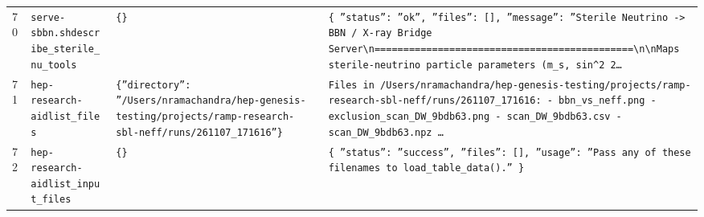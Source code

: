 \documentclass[11pt,a4paper]{article}
\begin{document}
\begin{longtable}{@{}p{}p{}p{}p{}@{}}
70 & \texttt{serve-sbbn.sh}\newline\texttt{describe\_\allowbreak{}sterile\_\allowbreak{}nu\_\allowbreak{}tools} & \texttt{\{\}\allowbreak{}} & \texttt{\{   ''status'':\allowbreak{} ''ok'',\allowbreak{}   ''files'':\allowbreak{} []\allowbreak{},\allowbreak{}   ''message'':\allowbreak{} ''Sterile Neutrino -\textgreater{}\allowbreak{} BBN /\allowbreak{} X-ray Bridge Server\textbackslash{}\allowbreak{}n=\allowbreak{}=\allowbreak{}=\allowbreak{}=\allowbreak{}=\allowbreak{}=\allowbreak{}=\allowbreak{}=\allowbreak{}=\allowbreak{}=\allowbreak{}=\allowbreak{}=\allowbreak{}=\allowbreak{}=\allowbreak{}=\allowbreak{}=\allowbreak{}=\allowbreak{}=\allowbreak{}=\allowbreak{}=\allowbreak{}=\allowbreak{}=\allowbreak{}=\allowbreak{}=\allowbreak{}=\allowbreak{}=\allowbreak{}=\allowbreak{}=\allowbreak{}=\allowbreak{}=\allowbreak{}=\allowbreak{}=\allowbreak{}=\allowbreak{}=\allowbreak{}=\allowbreak{}=\allowbreak{}=\allowbreak{}=\allowbreak{}=\allowbreak{}=\allowbreak{}=\allowbreak{}=\allowbreak{}=\allowbreak{}=\allowbreak{}=\allowbreak{}\textbackslash{}\allowbreak{}n\textbackslash{}\allowbreak{}nMaps sterile-neutrino particle parameters (m\_\allowbreak{}s,\allowbreak{} sin\textasciicircum{}\allowbreak{}2 2\ldots{}\allowbreak{}} \\
71 & \texttt{hep-research-aid}\newline\texttt{list\_\allowbreak{}files} & \texttt{\{''directory'':\allowbreak{} ''/\allowbreak{}Users/\allowbreak{}nramachandra/\allowbreak{}hep-genesis-testing/\allowbreak{}projects/\allowbreak{}ramp-research-sbl-neff/\allowbreak{}runs/\allowbreak{}261107\_\allowbreak{}171616''\}\allowbreak{}} & \texttt{Files in /\allowbreak{}Users/\allowbreak{}nramachandra/\allowbreak{}hep-genesis-testing/\allowbreak{}projects/\allowbreak{}ramp-research-sbl-neff/\allowbreak{}runs/\allowbreak{}261107\_\allowbreak{}171616:\allowbreak{}   - bbn\_\allowbreak{}vs\_\allowbreak{}neff.png   - exclusion\_\allowbreak{}scan\_\allowbreak{}DW\_\allowbreak{}9bdb63.png   - scan\_\allowbreak{}DW\_\allowbreak{}9bdb63.csv   - scan\_\allowbreak{}DW\_\allowbreak{}9bdb63.npz \ldots{}\allowbreak{}} \\
72 & \texttt{hep-research-aid}\newline\texttt{list\_\allowbreak{}input\_\allowbreak{}files} & \texttt{\{\}\allowbreak{}} & \texttt{\{   ''status'':\allowbreak{} ''success'',\allowbreak{}   ''files'':\allowbreak{} []\allowbreak{},\allowbreak{}   ''usage'':\allowbreak{} ''Pass any of these filenames to load\_\allowbreak{}table\_\allowbreak{}data()\allowbreak{}.'' \}\allowbreak{}} \\

\end{longtable}
\end{document}
